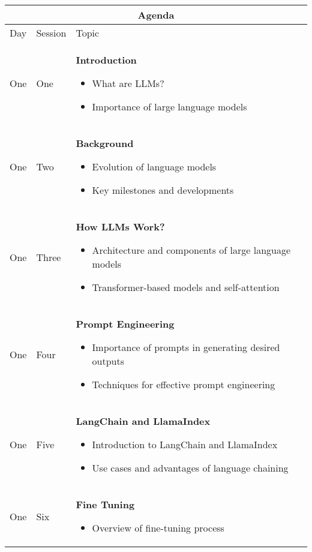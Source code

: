 \documentclass[a4paper, 11pt]{article}
\begin{document}
\begin{center} 
\begin{tabular}{ |p{1cm}|p{1cm}||p{10cm}|  }
 \hline
 \multicolumn{3}{|c|}{\textbf{\large Agenda}} \\
 \hline
Day & Session & Topic\\
 \hline
One	&	One  		& 	\textbf{Introduction}
\begin{itemize}[topsep=0pt, partopsep=0pt, itemsep=0pt, parsep=0pt]
\item What are LLMs? 
\item Importance of large language models
\end{itemize}
\\
One 	&   	Two  		&   	\textbf{Background}
\begin{itemize}[topsep=0pt, partopsep=0pt, itemsep=0pt, parsep=0pt]
\item Evolution of language models
\item Key milestones and developments
\end{itemize}
\\
One	&  	Three    	& 	\textbf{How LLMs Work?}
\begin{itemize}[topsep=0pt, partopsep=0pt, itemsep=0pt, parsep=0pt]
\item Architecture and components of large language models
\item Transformer-based models and self-attention
\end{itemize}
\\
One 	&   	Four  		&   	\textbf{Prompt Engineering}
\begin{itemize}[topsep=0pt, partopsep=0pt, itemsep=0pt, parsep=0pt]
\item Importance of prompts in generating desired outputs
\item Techniques for effective prompt engineering
\end{itemize}
\\
One	&  	Five		&  	\textbf{LangChain and LlamaIndex}
\begin{itemize}[topsep=0pt, partopsep=0pt, itemsep=0pt, parsep=0pt]
\item Introduction to LangChain and LlamaIndex
\item Use cases and advantages of language chaining
\end{itemize}
\\
One 	&   	Six		&   	\textbf{Fine Tuning} 
\begin{itemize}[topsep=0pt, partopsep=0pt, itemsep=0pt, parsep=0pt]
\item Overview of fine-tuning process

\end{itemize}
\end{tabular}
\end{center}
\end{document}
